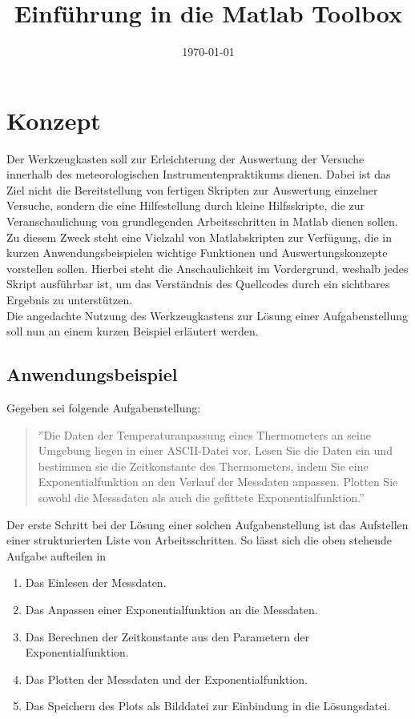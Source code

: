 \documentclass[a4paper,fleqn]{article}
\title{Einführung in die Matlab Toolbox}
\author{}
\date{\today}
\begin{document}
\maketitle

\section*{Konzept}
Der Werkzeugkasten soll zur Erleichterung der Auswertung der Versuche innerhalb
des meteorologischen Instrumentenpraktikums dienen. Dabei ist das Ziel nicht die
Bereitstellung von fertigen Skripten zur Auswertung einzelner Versuche, sondern
die eine Hilfestellung durch kleine Hilfsskripte, die zur Veranschaulichung von
grundlegenden Arbeitsschritten in Matlab dienen sollen.\\

Zu diesem Zweck steht eine Vielzahl von Matlabskripten zur Verfügung, die in
kurzen Anwendungsbeispielen wichtige Funktionen und Auswertungskonzepte
vorstellen sollen. Hierbei steht die Anschaulichkeit im Vordergrund, weshalb
jedes Skript ausführbar ist, um das Verständnis des Quellcodes durch ein
sichtbares Ergebnis zu unterstützen.\\

Die angedachte Nutzung des Werkzeugkastens zur Lösung einer Aufgabenstellung
soll nun an einem kurzen Beispiel erläutert werden.

\subsection*{Anwendungsbeispiel}
Gegeben sei folgende Aufgabenstellung:

\begin{quote}
''Die Daten der Temperaturanpassung eines Thermometers an seine Umgebung liegen
in einer ASCII-Datei vor. Lesen Sie die Daten ein und bestimmen sie die
Zeitkonstante des Thermometers, indem Sie eine Exponentialfunktion an den
Verlauf der Messdaten anpassen. Plotten Sie sowohl die Messsdaten als auch die
gefittete Exponentialfunktion.''
\end{quote}

Der erste Schritt bei der Lösung einer solchen Aufgabenstellung ist das
Aufstellen einer strukturierten Liste von Arbeitsschritten. So lässt sich die
oben stehende Aufgabe aufteilen in

\begin{enumerate}
  \item Das Einlesen der Messdaten.
  \item Das Anpassen einer Exponentialfunktion an die Messdaten.
  \item Das Berechnen der Zeitkonstante aus den Parametern der Exponentialfunktion.
  \item Das Plotten der Messdaten und der Exponentialfunktion.
  \item Das Speichern des Plots als Bilddatei zur Einbindung in die Lösungsdatei.
\end{enumerate}
\end{document}
